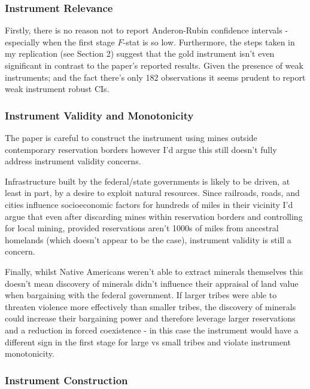 \documentclass[12pt]{article}
\begin{document}
\subsubsection*{Instrument Relevance}

Firstly, there is no reason not to report Anderon-Rubin confidence intervals - especially when the first stage $F$-stat is so low. Furthermore, the steps taken in my replication 
(see Section 2) suggest that the gold instrument isn't even significant in contrast to the paper's reported results. Given the presence of weak instruments; and the fact there's only 182 observations it seems prudent to report weak instrument robust CIs. 


\subsubsection*{Instrument Validity and Monotonicity}
The paper is careful to construct the instrument using mines outside contemporary reservation borders however I'd argue this still doesn't fully address instrument validity concerns.

Infrastructure built by the federal/state governments is likely to be driven, at least in part, by a desire to exploit natural resources. Since railroads, roads, and 
cities influence socioeconomic factors for hundreds of miles in their vicinity I'd argue that even after discarding mines within reservation borders and controlling 
for local mining, provided reservations aren't 1000s of miles from ancestral homelands (which doesn't appear to be the case), instrument validity is still a concern.  

Finally, whilst Native Americans weren't able to extract minerals themselves this doesn't mean discovery of minerals didn't influence their appraisal of land value when 
bargaining with the federal government. If larger tribes were able to threaten violence more effectively than smaller tribes, the discovery of minerals could increase their bargaining power and therefore leverage larger reservations and a reduction in forced coexistence - in this case the instrument would have a different sign in the first stage for large vs small tribes and violate instrument monotonicity.


\subsubsection*{Instrument Construction}
\end{document}
